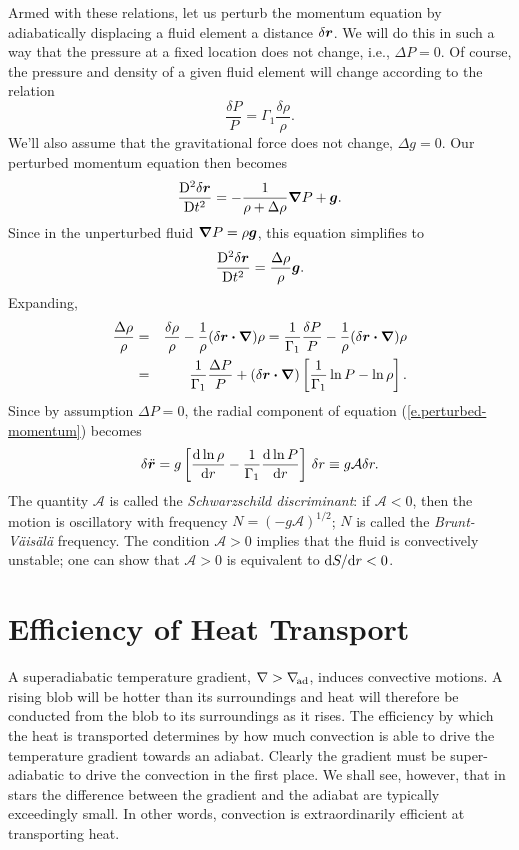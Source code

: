 Armed with these relations, let us perturb the momentum equation by adiabatically displacing a fluid element a distance $\delta\boldsymbol{r}$.  We will do this in such a way that the pressure at a fixed location does not change, i.e., $\Delta P = 0$. Of course, the pressure and density of a given fluid element will change according to the relation
\[
\frac{\delta P}{P} = \Gamma_{1}\frac{\delta\rho}{\rho}.
\]
We'll also assume that the gravitational force does not change, $\Delta g = 0$.  Our perturbed momentum equation then becomes
\[
\frac{\mathrm{D}^{2}\delta\boldsymbol{r}}{\mathrm{D} t^{2}} = -\frac{1}{\rho + \Delta \rho}\boldsymbol{\nabla} P+ \boldsymbol{g}.
\]
Since in the unperturbed fluid $\boldsymbol{\nabla} P = \rho\boldsymbol{g}$, this equation simplifies to
\begin{equation}\label{e.perturbed-momentum}
\frac{\mathrm{D}^{2}\delta\boldsymbol{r}}{\mathrm{D} t^{2}} = \frac{\Delta \rho}{\rho}\boldsymbol{g}.
\end{equation}
Expanding,
\begin{eqnarray*}
\frac{\Delta \rho}{\rho} &=& \frac{\delta \rho}{\rho} - \frac{1}{\rho}(\delta\boldsymbol{r}\boldsymbol{\cdot}\boldsymbol{\nabla})\rho = \frac{1}{\Gamma_{1}}\frac{\delta P}{P} - \frac{1}{\rho}(\delta\boldsymbol{r}\boldsymbol{\cdot}\boldsymbol{\nabla})\rho\\
 &=& \frac{1}{\Gamma_{1}}\frac{\Delta P}{P} + (\delta\boldsymbol{r}\boldsymbol{\cdot}\boldsymbol{\nabla})\left[\frac{1}{\Gamma_{1}}\ln P-\ln \rho\right].
\end{eqnarray*}
Since by assumption $\Delta P = 0$, the radial component of equation (\ref{e.perturbed-momentum}) becomes
\begin{equation}\label{e.blob-eq-of-motion}
\delta\ddot{\boldsymbol{r}} = g\left[ \frac{\mathrm{d}\ln\rho}{\mathrm{d} r} - \frac{1}{\Gamma_{1}}\frac{\mathrm{d}\ln P}{\mathrm{d} r} \right] \,\delta r 
	\equiv g \mathcal{A} \delta r.
\end{equation}
The quantity $\mathcal{A}$ is called the \emph{Schwarzschild discriminant}: if $\mathcal{A} < 0$, then the motion is oscillatory with frequency $N = (-g\mathcal{A})^{1/2}$; $N$ is called the \emph{Brunt-V\"ais\"al\"a} frequency. The condition $\mathcal{A} > 0$ implies that the fluid is convectively unstable; one can show that $\mathcal{A} > 0$ is equivalent to $\mathrm{d} S/\mathrm{d} r < 0$.

\section{Efficiency of Heat Transport}

A superadiabatic temperature gradient, $\nabla > \nabla_{\!\mathrm{ad}}$, induces convective motions. A rising blob will be hotter than its surroundings and heat will therefore be conducted from the blob to its surroundings as it rises. The efficiency by which the heat is transported determines by how much convection is able to drive the temperature gradient towards an adiabat. Clearly the gradient must be super-adiabatic to drive the convection in the first place. We shall see, however, that in stars the difference between the gradient and the adiabat are typically exceedingly small. In other words, convection is extraordinarily efficient at transporting heat.

